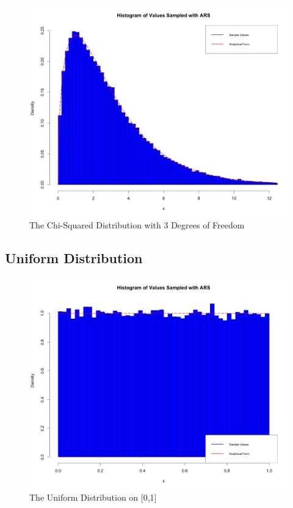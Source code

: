 \documentclass[12pt, oneside]{article}
\begin{document}
\begin{figure}[H]
\centering
  \includegraphics[scale=.25]{figure/chi_squared_dof3.jpeg}
  \caption{The Chi-Squared Distribution with 3 Degrees of Freedom}
  \label{fig:d2}
\end{figure}

\subsection{Uniform Distribution}

\begin{figure}[H]
\centering
  \includegraphics[scale=.25]{figure/uniform.jpeg}
  \caption{The Uniform Distribution on [0,1]}
  \label{fig:d3}
\end{figure}
\end{document}
